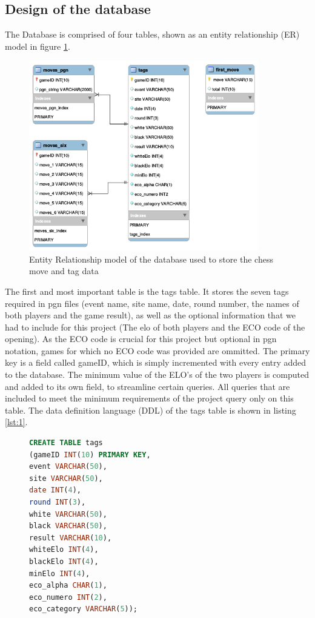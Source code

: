 \documentclass{article}
\begin{document}
\subsection{Design of the database}
The Database is comprised of four tables, shown as an entity relationship
(ER) model in figure \ref{figure:4}.

\begin{figure}[h]
	\includegraphics[width=10cm]{EER}
	\caption{Entity Relationship model of the database used to store the
	chess move and tag data}
	\label{figure:4}
\end{figure}

The first and most important table is the tags table.  It stores the seven
tags required in pgn files (event name, site name, date, round number, the
names of both players and the game result), as well as the optional information
that we had to include for this project (The elo of both players and the
ECO code of the opening). As the ECO code is crucial for this project but
optional in pgn notation, games for which no ECO code was provided are
ommitted. The primary key is a field called gameID, which is simply incremented
with every entry added to the database. The minimum value of the ELO's of
the two players is computed and added to its own field, to streamline
certain queries.  All queries that are included to meet the minimum
requirements of the project query only on this table.
The data definition language (DDL) of the tags table is shown in listing
\ref{lst:1}.

\begin{figure}[h]
	\begin{lstlisting}[label={lst:1}, language=sql, frame=single, caption=DDL describing the structure of the tags table]
CREATE TABLE tags
(gameID INT(10) PRIMARY KEY,
event VARCHAR(50),
site VARCHAR(50),
date INT(4),
round INT(3),
white VARCHAR(50),
black VARCHAR(50),
result VARCHAR(10),
whiteElo INT(4),
blackElo INT(4),
minElo INT(4),
eco_alpha CHAR(1),
eco_numero INT(2),
eco_category VARCHAR(5));
	\end{lstlisting}
\end{figure}
\end{document}
